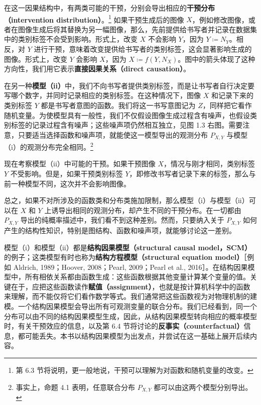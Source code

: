 在这一因果结构中，有两类可能的干预，分别会导出相应的\textbf{干预分布（intervention distribution）}。\footnote{第 6.3 节将说明，更一般地说，干预可以理解为对函数和随机变量的改变。}
如果干预生成后的图像 $X$，例如修改图像，或者在图像生成后将其替换为另一幅图像，那么，先前提供给书写者并记录在数据集中的类别标签不会受到影响。形式上，改变 $X$ 不会影响 $Y$，因为 $Y\coloneqq N_Y$。相反，对 $Y$ 进行干预，意味着改变提供给书写者的类别标签，这会显著影响生成的图像。形式上，改变 $Y$ 会影响 $X$，因为 $X\coloneqq f(Y,N_X)$。图中的箭头体现了这种方向性，我们用它表示\textbf{直接因果关系（direct causation）}。

在另一种\textbf{模型（ii）}中，我们不向书写者提供类别标签，而是让书写者自行决定要写哪个数字，并同时记录相应的类别标签。在这种情况下，图像 $X$ 和记录下来的类别标签 $Y$ 都是书写者意图的函数。我们将这一书写意图记为 $Z$，同样把它看作随机变量。为使模型具有一般性，我们不仅假设图像生成过程含有噪声，也假设类别标签的记录过程含有噪声；这些噪声项仍然相互独立，见图 1.3 右图。需要注意，只要适当选择函数和噪声项，就能使这一模型导出的观测分布 $P_{X,Y}$ 与模型（i）的观测分布完全相同。\footnote{事实上，命题 4.1 表明，任意联合分布 $P_{X,Y}$ 都可以由这两个模型分别导出。}



现在考察模型（ii）中可能的干预。如果干预图像 $X$，情况与刚才相同，类别标签 $Y$ 不受影响。但是，如果干预类别标签 $Y$，即修改书写者记录下来的标签，那么与前一种模型不同，这次并不会影响图像。

总之，如果不对所涉及的函数类和分布类施加限制，那么模型（i）与模型（ii）可以在 $X$ 和 $Y$ 上诱导出相同的观测分布，却产生不同的干预分布。在一切都由 $P_{X,Y}$ 导出的纯概率描述中，我们看不到这种差别。然而，只要纳入关于 $P_{X,Y}$ 如何产生的结构性知识，特别是图结构、函数和噪声项，就能够讨论这一差别。

模型（i）和模型（ii）都是\textbf{结构因果模型（structural causal model，SCM）}的例子；这类模型有时也称为\textbf{结构方程模型（structural equation model）}［例如 Aldrich, 1989；Hoover, 2008；Pearl, 2009；Pearl et al., 2016］。在结构因果模型中，所有相依关系都由函数生成：这些函数根据其他变量计算某个变量的值。关键在于，应把这些函数读作\textbf{赋值（assignment）}，也就是按计算机科学中的函数来理解，而不能仅将它们看作数学等式。我们通常把这些函数视为对物理机制的建模。一个结构因果模型会导出所有可观测变量的联合分布。我们已经看到，同一个分布可以由不同的结构因果模型生成，因此，从结构因果模型转向相应的概率模型时，有关干预效应的信息，以及第 6.4 节将讨论的\textbf{反事实（counterfactual）}信息，都可能丢失。本书以结构因果模型为出发点，并尝试在这一基础上展开后续内容。

